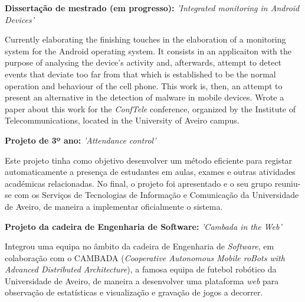 \documentclass[11pt,a4paper,sans]{moderncv} %
\begin{document}
\vspace{5pt}

\begin{itemize}

\item{\textbf{Dissertação de mestrado (em progresso): } \textit{'Integrated
      monitoring in Android Devices'}

\vspace{3pt}

\small{Currently elaborating the finishing touches in the elaboration of a
  monitoring system for the Android operating system. It consists in an
  applicaiton with the purpose of analysing the device's activity and,
  afterwards, attempt to detect events that deviate too far from that which is
  established to be the normal operation and behaviour of the cell phone. This
  work is, then, an attempt to present an alternative in the detection of
  malware in mobile devices. Wrote a paper about this work for the
  \textit{ConfTele} conference, organized by the Institute of
  Telecommunications, located in the University of Aveiro campus.}

\item{\textbf{Projeto de 3º ano: } \textit{'Attendance control'}

\vspace{3pt}

\small{Este projeto tinha como objetivo desenvolver um método eficiente para
  registar automaticamente a presença de estudantes em aulas, exames e outras
  atividades académicas relacionadas. No final, o projeto foi apresentado e o
  seu grupo reuniu-se com os Serviços de Tecnologias de Informação e Comunicação
  da Universidade de Aveiro, de maneira a implementar oficialmente o sistema.}}

\vspace{6pt}

\item{\textbf{Projeto da cadeira de Engenharia de Software: }\textit{'Cambada
      in the Web'}}

\vspace{3pt}

\small{Integrou uma equipa no âmbito da cadeira de Engenharia de
  \textit{Software}, em colaboração com o CAMBADA (\textit{Cooperative
    Autonomous Mobile roBots with Advanced Distributed Architecture}), a famosa
  equipa de futebol robótico da Universidade de Aveiro, de maneira a desenvolver
  uma plataforma \textit{web} para observação de estatísticas e visualização e
  gravação de jogos a decorrer.}}


\end{itemize}
\end{document}
